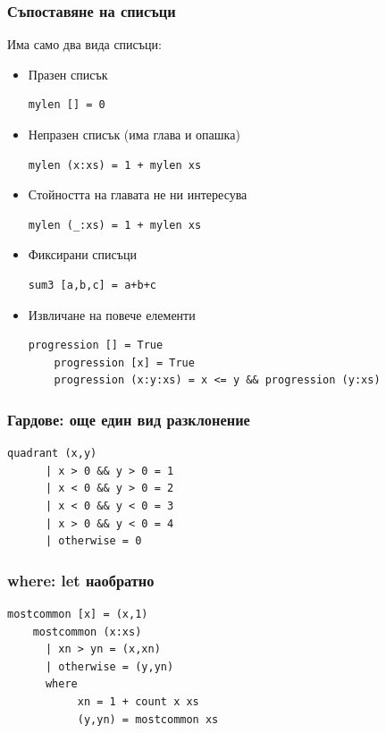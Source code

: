 \documentclass{beamer}
\begin{document}
\begin{frame}[fragile]
  \frametitle{Съпоставяне на списъци}

  Има само два вида списъци:
\begin{itemize}
  \item Празен списък
  \begin{lstlisting}[basicstyle=\small]
    mylen [] = 0
  \end{lstlisting}
  \item Непразен списък (има глава и опашка)
  \begin{lstlisting}[basicstyle=\small]
    mylen (x:xs) = 1 + mylen xs
  \end{lstlisting}
  \item Стойността на главата не ни интересува
  \begin{lstlisting}[basicstyle=\small]
    mylen (_:xs) = 1 + mylen xs
  \end{lstlisting}
  \item Фиксирани списъци
  \begin{lstlisting}[basicstyle=\small]
    sum3 [a,b,c] = a+b+c
  \end{lstlisting}
  \item Извличане на повече елементи
  \begin{lstlisting}[basicstyle=\small]
    progression [] = True
    progression [x] = True
    progression (x:y:xs) = x <= y && progression (y:xs)
  \end{lstlisting}
 
\end{itemize}

\end{frame}


\begin{frame}[fragile]
  \frametitle{Гардове: още един вид разклонение}

  \begin{lstlisting}[basicstyle=\small]
    quadrant (x,y) 
      | x > 0 && y > 0 = 1
      | x < 0 && y > 0 = 2
      | x < 0 && y < 0 = 3
      | x > 0 && y < 0 = 4
      | otherwise = 0
  \end{lstlisting}


\end{frame}


\begin{frame}[fragile]
  \frametitle{where: let наобратно}
  \begin{lstlisting}[basicstyle=\small]
    mostcommon [x] = (x,1)
    mostcommon (x:xs)
      | xn > yn = (x,xn)
      | otherwise = (y,yn)
      where
           xn = 1 + count x xs 
           (y,yn) = mostcommon xs
  \end{lstlisting}
\end{frame}
\end{document}
